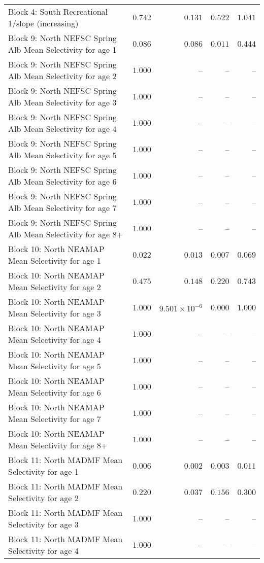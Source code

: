 \documentclass[
]{article}
\begin{document}
\begin{landscape}
\begin{longtable}[t]{lrrrr}
Block 4: South Recreational 1/slope (increasing) & $0.742$ & $0.131$ & $0.522$ & $1.041$\\
Block 9: North NEFSC Spring Alb Mean Selectivity for age 1 & $0.086$ & $0.086$ & $0.011$ & $0.444$\\
Block 9: North NEFSC Spring Alb Mean Selectivity for age 2 & $1.000$ & -- & -- & --\\
Block 9: North NEFSC Spring Alb Mean Selectivity for age 3 & $1.000$ & -- & -- & --\\
\addlinespace
Block 9: North NEFSC Spring Alb Mean Selectivity for age 4 & $1.000$ & -- & -- & --\\
Block 9: North NEFSC Spring Alb Mean Selectivity for age 5 & $1.000$ & -- & -- & --\\
Block 9: North NEFSC Spring Alb Mean Selectivity for age 6 & $1.000$ & -- & -- & --\\
Block 9: North NEFSC Spring Alb Mean Selectivity for age 7 & $1.000$ & -- & -- & --\\
Block 9: North NEFSC Spring Alb Mean Selectivity for age 8+ & $1.000$ & -- & -- & --\\
\addlinespace
Block 10: North NEAMAP Mean Selectivity for age 1 & $0.022$ & $0.013$ & $0.007$ & $0.069$\\
Block 10: North NEAMAP Mean Selectivity for age 2 & $0.475$ & $0.148$ & $0.220$ & $0.743$\\
Block 10: North NEAMAP Mean Selectivity for age 3 & $1.000$ & $9.501\times 10^{-6}$ & $0.000$ & $1.000$\\
Block 10: North NEAMAP Mean Selectivity for age 4 & $1.000$ & -- & -- & --\\
Block 10: North NEAMAP Mean Selectivity for age 5 & $1.000$ & -- & -- & --\\
\addlinespace
Block 10: North NEAMAP Mean Selectivity for age 6 & $1.000$ & -- & -- & --\\
Block 10: North NEAMAP Mean Selectivity for age 7 & $1.000$ & -- & -- & --\\
Block 10: North NEAMAP Mean Selectivity for age 8+ & $1.000$ & -- & -- & --\\
Block 11: North MADMF Mean Selectivity for age 1 & $0.006$ & $0.002$ & $0.003$ & $0.011$\\
Block 11: North MADMF Mean Selectivity for age 2 & $0.220$ & $0.037$ & $0.156$ & $0.300$\\
\addlinespace
Block 11: North MADMF Mean Selectivity for age 3 & $1.000$ & -- & -- & --\\
Block 11: North MADMF Mean Selectivity for age 4 & $1.000$ & -- & -- & --\\

\end{longtable}
\end{landscape}
\end{document}
